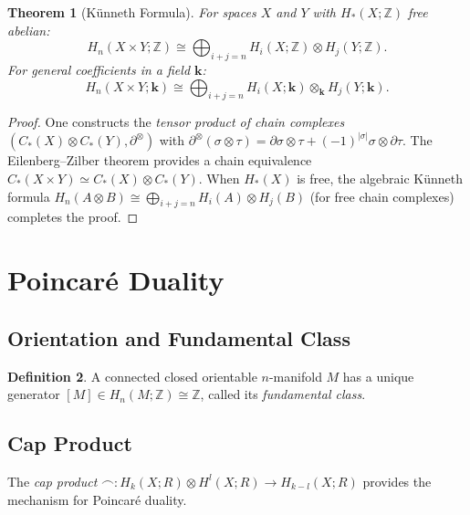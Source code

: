 \documentclass[12pt,a4paper]{amsart}
\newtheorem{theorem}{Theorem}[section]
\theoremstyle{definition}
\newtheorem{definition}[theorem]{Definition}
\begin{document}
\begin{theorem}[K\"unneth Formula]
\label{thm:kunneth}
For spaces $X$ and $Y$ with $H_*(X;\mathbb{Z})$ free abelian:
\[
  H_n(X \times Y;\mathbb{Z})
  \cong \bigoplus_{i+j=n} H_i(X;\mathbb{Z}) \otimes H_j(Y;\mathbb{Z}).
\]
For general coefficients in a field $\mathbf{k}$:
\[
  H_n(X \times Y; \mathbf{k})
  \cong \bigoplus_{i+j=n} H_i(X;\mathbf{k}) \otimes_\mathbf{k} H_j(Y;\mathbf{k}).
\]
\end{theorem}
\begin{proof}
One constructs the \emph{tensor product of chain complexes}
$(C_*(X) \otimes C_*(Y), \partial^\otimes)$ with
$\partial^\otimes(\sigma \otimes \tau) = \partial\sigma \otimes \tau
+ (-1)^{|\sigma|} \sigma \otimes \partial\tau$.
The Eilenberg--Zilber theorem provides a chain equivalence
$C_*(X \times Y) \simeq C_*(X) \otimes C_*(Y)$.
When $H_*(X)$ is free, the algebraic K\"unneth formula
$H_n(A \otimes B) \cong \bigoplus_{i+j=n} H_i(A) \otimes H_j(B)$
(for free chain complexes) completes the proof.
\end{proof}

\section{Poincar\'e Duality}
\label{sec:poincare}

\subsection{Orientation and Fundamental Class}

\begin{definition}
A connected closed orientable $n$-manifold $M$ has a unique generator
$[M] \in H_n(M;\mathbb{Z}) \cong \mathbb{Z}$, called its
\emph{fundamental class}.
\end{definition}

\subsection{Cap Product}

The \emph{cap product} $\frown\colon H_k(X;R) \otimes H^l(X;R) \to H_{k-l}(X;R)$
provides the mechanism for Poincar\'e duality.
\end{document}
